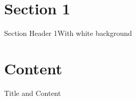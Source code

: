 \documentclass[10pt]{beamer} %
\begin{document}
\section{Section 1}
{\sectionheaderWhite %
\begin{frame}{Section Header 1}{With white background}
\end{frame}
}

\section{Content} 
\begin{frame}{Title and Content}
\begin{columns}
  \begin{column}{0.3\textwidth}
    \begin{center}

\end{center}
\end{column}
\end{columns}
\end{frame}
\end{document}
